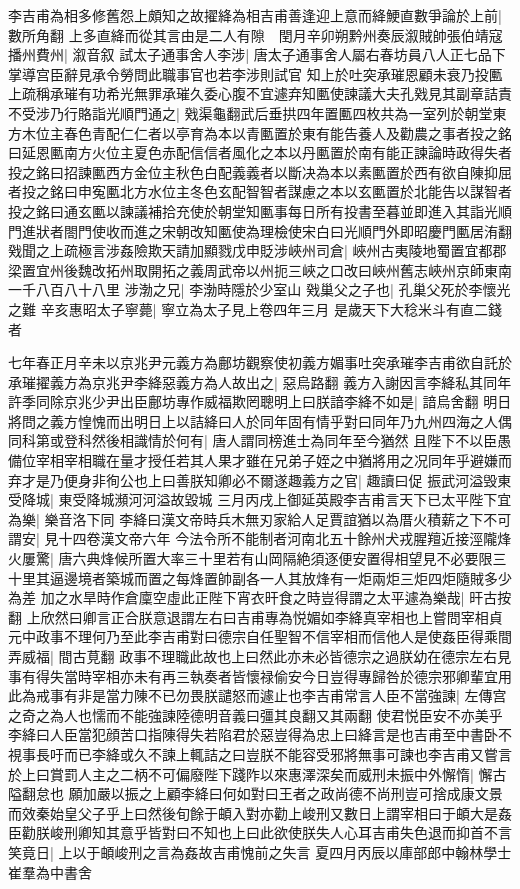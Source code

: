 李吉甫為相多修舊怨上頗知之故擢絳為相吉甫善逢迎上意而絳鯁直數爭論於上前|{
	數所角翻}
上多直絳而從其言由是二人有隙　閏月辛卯朔黔州奏辰溆賊帥張伯靖寇播州費州|{
	溆音叙}
試太子通事舍人李涉|{
	唐太子通事舍人屬右春坊員八人正七品下掌導宫臣辭見承令勞問此職事官也若李涉則試官}
知上於吐突承璀恩顧未衰乃投匭上疏稱承璀有功希光無罪承璀久委心腹不宜遽弃知匭使諫議大夫孔戣見其副章詰責不受涉乃行賂詣光順門通之|{
	戣渠龜翻武后垂拱四年置匭四枚共為一室列於朝堂東方木位主春色青配仁仁者以亭育為本以青匭置於東有能告養人及勸農之事者投之銘曰延恩匭南方火位主夏色赤配信信者風化之本以丹匭置於南有能正諫論時政得失者投之銘曰招諫匭西方金位主秋色白配義義者以斷决為本以素匭置於西有欲自陳抑屈者投之銘曰申寃匭北方水位主冬色玄配智智者謀慮之本以玄匭置於北能告以謀智者投之銘曰通玄匭以諫議補拾充使於朝堂知匭事每日所有投書至暮並即進入其詣光順門進狀者閤門使收而進之宋朝改知匭使為理檢使宋白曰光順門外即昭慶門匭居洧翻}
戣聞之上疏極言涉姦險欺天請加顯戮戊申貶涉峽州司倉|{
	峽州古夷陵地蜀置宜都郡梁置宜州後魏改拓州取開拓之義周武帝以州扼三峽之口改曰峽州舊志峽州京師東南一千八百八十八里}
涉渤之兄|{
	李渤時隱於少室山}
戣巢父之子也|{
	孔巢父死於李懷光之難}
辛亥惠昭太子寧薨|{
	寧立為太子見上卷四年三月}
是歲天下大稔米斗有直二錢者

七年春正月辛未以京兆尹元義方為鄜坊觀察使初義方媚事吐突承璀李吉甫欲自託於承璀擢義方為京兆尹李絳惡義方為人故出之|{
	惡烏路翻}
義方入謝因言李絳私其同年許季同除京兆少尹出臣鄜坊專作威福欺罔聰明上曰朕諳李絳不如是|{
	諳烏舍翻}
明日將問之義方惶愧而出明日上以詰絳曰人於同年固有情乎對曰同年乃九州四海之人偶同科第或登科然後相識情於何有|{
	唐人謂同榜進士為同年至今猶然}
且陛下不以臣愚備位宰相宰相職在量才授任若其人果才雖在兄弟子姪之中猶將用之况同年乎避嫌而弃才是乃便身非徇公也上曰善朕知卿必不爾遂趣義方之官|{
	趣讀曰促}
振武河溢毁東受降城|{
	東受降城瀕河河溢故毀城}
三月丙戌上御延英殿李吉甫言天下已太平陛下宜為樂|{
	樂音洛下同}
李絳曰漢文帝時兵木無刃家給人足賈誼猶以為厝火積薪之下不可謂安|{
	見十四卷漢文帝六年}
今法令所不能制者河南北五十餘州犬戎腥羶近接涇隴烽火屢驚|{
	唐六典烽候所置大率三十里若有山岡隔絶須逐便安置得相望見不必要限三十里其逼邊境者築城而置之每烽置帥副各一人其放烽有一炬兩炬三炬四炬隨賊多少為差}
加之水旱時作倉廩空虛此正陛下宵衣旰食之時豈得謂之太平遽為樂哉|{
	旰古按翻}
上欣然曰卿言正合朕意退謂左右曰吉甫專為悦媚如李絳真宰相也上嘗問宰相貞元中政事不理何乃至此李吉甫對曰德宗自任聖智不信宰相而信他人是使姦臣得乘間弄威福|{
	間古莧翻}
政事不理職此故也上曰然此亦未必皆德宗之過朕幼在德宗左右見事有得失當時宰相亦未有再三執奏者皆懷禄偷安今日豈得專歸咎於德宗邪卿輩宜用此為戒事有非是當力陳不已勿畏朕譴怒而遽止也李吉甫常言人臣不當強諫|{
	左傳宫之奇之為人也懦而不能強諫陸德明音義曰彊其良翻又其兩翻}
使君悦臣安不亦美乎李絳曰人臣當犯顔苦口指陳得失若陷君於惡豈得為忠上曰絳言是也吉甫至中書卧不視事長吁而已李絳或久不諫上輒詰之曰豈朕不能容受邪將無事可諫也李吉甫又嘗言於上曰賞罰人主之二柄不可偏廢陛下踐阼以來惠澤深矣而威刑未振中外懈惰|{
	懈古隘翻怠也}
願加嚴以振之上顧李絳曰何如對曰王者之政尚德不尚刑豈可捨成康文景而效秦始皇父子乎上曰然後旬餘于頔入對亦勸上峻刑又數日上謂宰相曰于頔大是姦臣勸朕峻刑卿知其意乎皆對曰不知也上曰此欲使朕失人心耳吉甫失色退而抑首不言笑竟日|{
	上以于頔峻刑之言為姦故吉甫愧前之失言}
夏四月丙辰以庫部郎中翰林學士崔羣為中書舍

